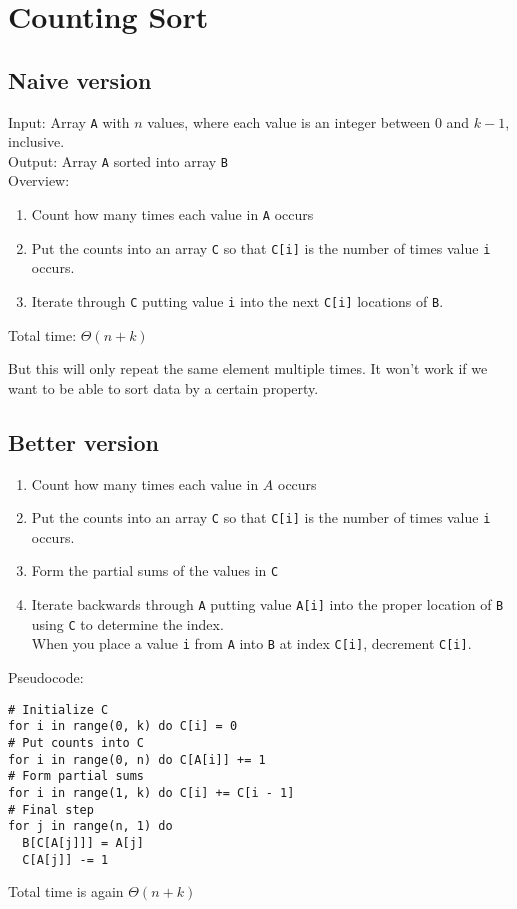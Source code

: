 \section{Counting Sort}
\label{sec:Counting-Sort}

\subsection*{Naive version}

Input: Array \verb|A| with $n$ values, where each value is an integer between 0 and $k-1$, inclusive.\\
Output: Array \verb|A| sorted into array \verb|B|\\
Overview:
\begin{enumerate}
    \item Count how many times each value in \verb|A| occurs
    \item Put the counts into an array \verb|C| so that \verb|C[i]| is the number of times value \verb|i| occurs.
    \item Iterate through \verb|C| putting value \verb|i| into the next \verb|C[i]| locations of \verb|B|.
\end{enumerate}

Total time: $\Theta(n + k)$

But this will only repeat the same element multiple times. It won't work if we want to be able to sort data by a certain property.

\subsection*{Better version}

\begin{enumerate}
    \item Count how many times each value in $A$ occurs
    \item Put the counts into an array \verb|C| so that \verb|C[i]| is the number of times value \verb|i| occurs.
    \item Form the partial sums of the values in \verb|C|
    \item Iterate backwards through \verb|A| putting value \verb|A[i]| into the proper location of \verb|B| using \verb|C| to determine the index.\\
    When you place a value \verb|i| from \verb|A| into \verb|B| at index \verb|C[i]|, decrement \verb|C[i]|.
\end{enumerate}

Pseudocode:
\begin{verbatim}
# Initialize C
for i in range(0, k) do C[i] = 0
# Put counts into C
for i in range(0, n) do C[A[i]] += 1
# Form partial sums
for i in range(1, k) do C[i] += C[i - 1]
# Final step
for j in range(n, 1) do
  B[C[A[j]]] = A[j]
  C[A[j]] -= 1
\end{verbatim}

Total time is again $\Theta(n + k)$
